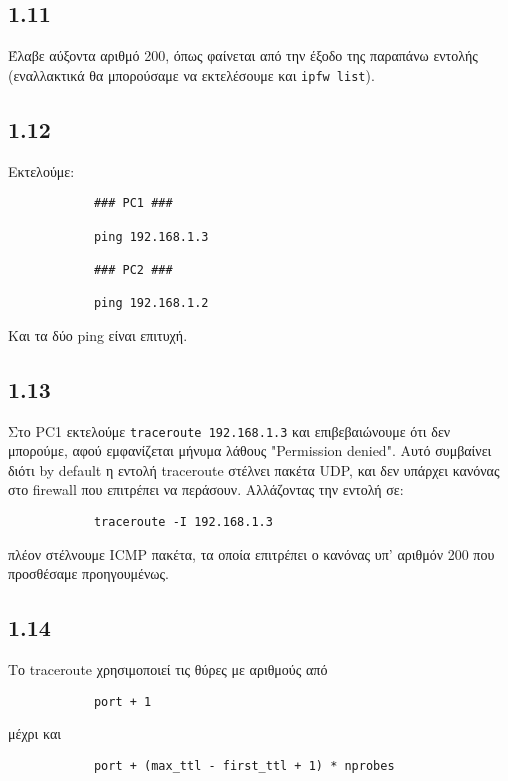 \documentclass[a4paper, 12pt]{article}
\begin{document}
	\subsection*{1.11}
		Έλαβε αύξοντα αριθμό 200, όπως φαίνεται από την έξοδο της παραπάνω εντολής (εναλλακτικά θα μπορούσαμε να εκτελέσουμε και \verb|ipfw list|).

	\subsection*{1.12}
		Εκτελούμε:
		
		\begin{verbatim}
			### PC1 ###
			
			ping 192.168.1.3
			
			### PC2 ###
			
			ping 192.168.1.2
		\end{verbatim}
		
		Και τα δύο ping είναι επιτυχή.

	\subsection*{1.13}
		Στο PC1 εκτελούμε \verb|traceroute 192.168.1.3| και επιβεβαιώνουμε ότι δεν μπορούμε, αφού εμφανίζεται μήνυμα λάθους "Permission denied". Αυτό συμβαίνει διότι by default η εντολή traceroute στέλνει πακέτα UDP, και δεν υπάρχει κανόνας στο firewall που επιτρέπει να περάσουν. Αλλάζοντας την εντολή σε:
		
		\begin{verbatim}
			traceroute -I 192.168.1.3
		\end{verbatim}
		
		πλέον στέλνουμε ICMP πακέτα, τα οποία επιτρέπει ο κανόνας υπ' αριθμόν 200 που προσθέσαμε προηγουμένως.

	\subsection*{1.14}
		Το traceroute χρησιμοποιεί τις θύρες με αριθμούς από 
		
		\begin{verbatim}
			port + 1
		\end{verbatim}
		
		μέχρι και 
		
		\begin{verbatim}
			port + (max_ttl - first_ttl + 1) * nprobes
		\end{verbatim}
		
\end{document}
